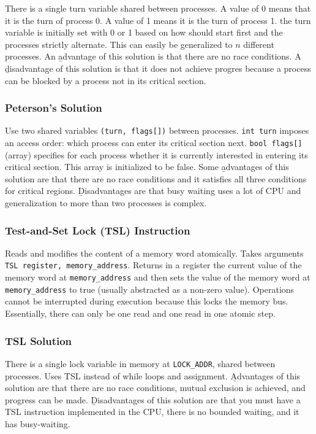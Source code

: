 \documentclass{article}
\begin{document}
    There is a single turn variable shared between processes. A value of 0 means that it is the turn of process 0. A value of 1 means it is the turn of process 1. the turn variable is initially set with 0 or 1 based on how should start first and the processes strictly alternate. This can easily be generalized to $n$ different processes. An \b{advantage} of this solution is that there are no race conditions. A \b{disadvantage} of this solution is that it does not achieve progres because a process can be blocked by a process not in its critical section.

    \subsubsection{Peterson's Solution}

    Use two shared variables \texttt{(turn, flags[])} between processes. \texttt{int turn} imposes an access order: which process can enter its critical section next. \texttt{bool flags[]} (array) specifies for each process whether it is currently interested in entering its critical section. This array is initialized to be false. Some \b{advantages} of this solution are that there are no race conditions and it satisfies all three conditions for critical regions. \b{Disadvantages} are that busy waiting uses a lot of CPU and generalization to more than two processes is complex. 

    \subsubsection{Test-and-Set Lock (TSL) Instruction}

    Reads and modifies the content of a memory word atomically. Takes arguments \texttt{TSL register, memory\_address}. Returns in a register the current value of the memory word at \texttt{memory\_address} and then sets the value of the memory word at \texttt{memory\_address} to true (usually abstracted as a non-zero value). Operations cannot be interrupted during execution because this locks the memory bus. Essentially, there can only be one read and one read in one atomic step. 

    \subsubsection{TSL Solution}

    There is a single lock variable in memory at \texttt{LOCK\_ADDR}, shared between processes. Uses TSL instead of while loops and assignment. \b{Advantages} of this solution are that there are no race conditions, mutual exclusion is achieved, and progress can be made. \b{Disadvantages} of this solution are that you must have a TSL instruction implemented in the CPU, there is no bounded waiting, and it has busy-waiting. 
        
\end{document}
